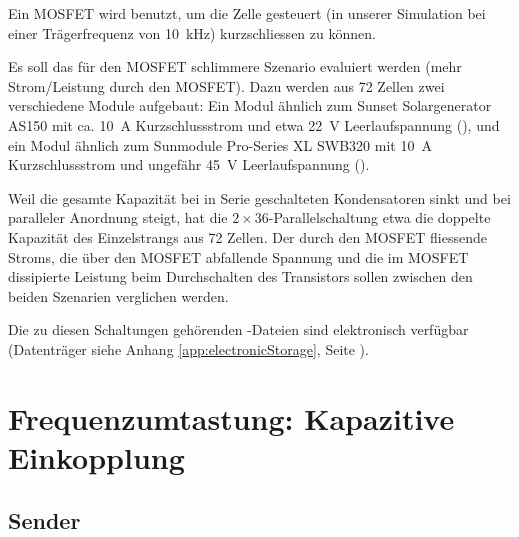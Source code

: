 Ein MOSFET  wird benutzt, um  die Zelle  gesteuert (in unserer  Simulation bei
einer Tr\"agerfrequenz von \SI{10}{\kilo\hertz}) kurzschliessen zu k\"onnen.

Es    soll   das    f\"ur   den    MOSFET   schlimmere    Szenario   evaluiert
werden   (mehr    Strom/Leistung   durch    den   MOSFET). Dazu
werden   aus  72   Zellen  zwei   verschiedene  Module   aufgebaut: Ein  Modul
\"ahnlich    zum    Sunset   Solargenerator    AS150    \cite{ref:solar:as150}
mit    ca. \SI{10}{\ampere}   Kurzschlussstrom    und   etwa    \SI{22}{\volt}
Leerlaufspannung  (),  und  ein  Modul
\"ahnlich  zum Sunmodule  Pro-Series  XL SWB320  \cite{ref:solar:sunmodulePro}
mit   \SI{10}{\ampere}   Kurzschlussstrom    und   ungef\"ahr   \SI{45}{\volt}
Leerlaufspannung ().

Weil die gesamte Kapazit\"at bei in Serie geschalteten Kondensatoren sinkt und
bei  paralleler  Anordnung steigt,  hat  die  $2 \times  36$-Parallelschaltung
 etwa die doppelte Kapazit\"at des Einzelstrangs
aus 72 Zellen. Der  durch den MOSFET fliessende Stroms, die  \"uber den MOSFET
abfallende Spannung und die im  MOSFET dissipierte Leistung beim Durchschalten
des Transistors sollen zwischen den beiden Szenarien verglichen werden.

Die zu  diesen Schaltungen geh\"orenden -Dateien  sind elektronisch
verf\"ugbar  (Datentr\"ager  siehe Anhang  \ref{app:electronicStorage},  Seite
\pageref{app:electronicStorage}).



\section{Frequenzumtastung: Kapazitive Einkopplung}
\label{sec:simu:fsk:capacitive}

\subsection{Sender}
\label{sec:simu:fsk:capacitive:transmitter}


